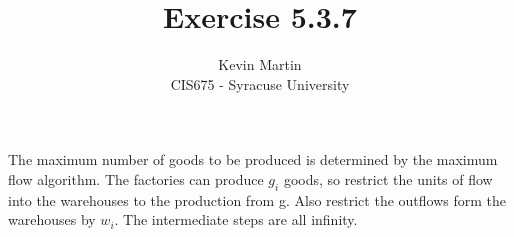\documentclass{article}
\author{Kevin Martin\\ CIS675 - Syracuse University}
\title{Exercise 5.3.7}
\begin{document}
\maketitle
The maximum number of goods to be produced is determined by the 
maximum flow algorithm. The factories can produce $g_{i}$ goods, 
so restrict the units of flow into the warehouses to the production from g. 
Also restrict the outflows form the warehouses by $w_{i}$. The intermediate
steps are all infinity.
\end{document}
